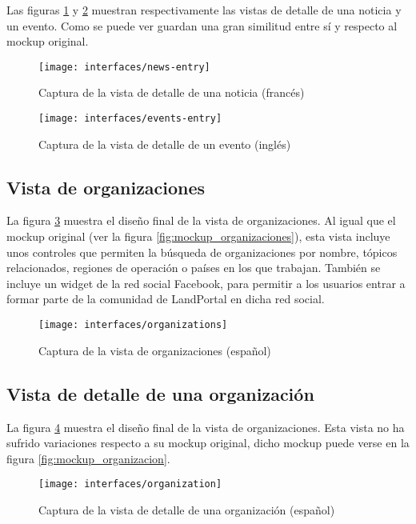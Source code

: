 Las figuras \ref{fig:interface_noticia} y \ref{fig:interface_evento} muestran respectivamente las vistas de detalle de una noticia y un evento.  Como se puede ver guardan una gran similitud entre sí y respecto al mockup original. 
\begin{figure}[h]
	\centering
	\texttt{[image: interfaces/news-entry]}
	\caption{Captura de la vista de detalle de una noticia (francés)}
	\label{fig:interface_noticia}
\end{figure}
\begin{figure}[h]
	\centering
	\texttt{[image: interfaces/events-entry]}
	\caption{Captura de la vista de detalle de un evento (inglés)}
	\label{fig:interface_evento}
\end{figure}


\subsection{Vista de organizaciones}
La figura \ref{fig:interface_organizaciones} muestra el diseño final de la vista de organizaciones.  Al igual que el mockup original (ver la figura \ref{fig:mockup_organizaciones}), esta vista incluye unos controles que permiten la búsqueda de organizaciones por nombre, tópicos relacionados, regiones de operación o países en los que trabajan.  También se incluye un widget de la red social Facebook, para permitir a los usuarios entrar a formar parte de la comunidad de LandPortal en dicha red social.
\begin{figure}[h]
	\centering
	\texttt{[image: interfaces/organizations]}
	\caption{Captura de la vista de organizaciones (español)}
	\label{fig:interface_organizaciones}
\end{figure}


\subsection{Vista de detalle de una organización}
La figura \ref{fig:interface_organizacion} muestra el diseño final de la vista de organizaciones.  Esta vista no ha sufrido variaciones respecto a su mockup original, dicho mockup puede verse en la figura \ref{fig:mockup_organizacion}.
\begin{figure}[h]
	\centering
	\texttt{[image: interfaces/organization]}
	\caption{Captura de la vista de detalle de una organización (español)}
	\label{fig:interface_organizacion}
\end{figure}


